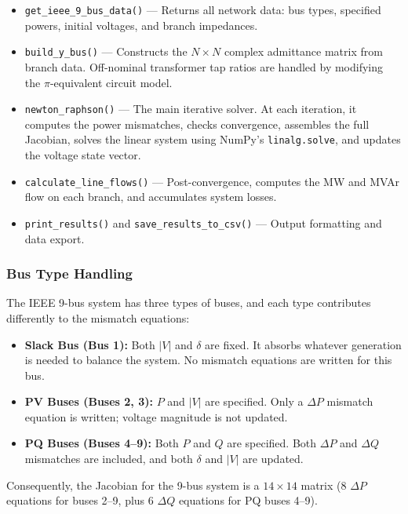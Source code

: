 \documentclass[12pt, a4paper]{article}
\begin{document}
\begin{itemize}
    \item \texttt{get\_ieee\_9\_bus\_data()} --- Returns all network data: bus types, specified powers, initial voltages, and branch impedances.
    \item \texttt{build\_y\_bus()} --- Constructs the $N \times N$ complex admittance matrix from branch data. Off-nominal transformer tap ratios are handled by modifying the $\pi$-equivalent circuit model.
    \item \texttt{newton\_raphson()} --- The main iterative solver. At each iteration, it computes the power mismatches, checks convergence, assembles the full Jacobian, solves the linear system using NumPy's \texttt{linalg.solve}, and updates the voltage state vector.
    \item \texttt{calculate\_line\_flows()} --- Post-convergence, computes the MW and MVAr flow on each branch, and accumulates system losses.
    \item \texttt{print\_results()} and \texttt{save\_results\_to\_csv()} --- Output formatting and data export.
\end{itemize}

\subsubsection{Bus Type Handling}
The IEEE 9-bus system has three types of buses, and each type contributes differently to the mismatch equations:
\begin{itemize}
    \item \textbf{Slack Bus (Bus 1):} Both $|V|$ and $\delta$ are fixed. It absorbs whatever generation is needed to balance the system. No mismatch equations are written for this bus.
    \item \textbf{PV Buses (Buses 2, 3):} $P$ and $|V|$ are specified. Only a $\Delta P$ mismatch equation is written; voltage magnitude is not updated.
    \item \textbf{PQ Buses (Buses 4--9):} Both $P$ and $Q$ are specified. Both $\Delta P$ and $\Delta Q$ mismatches are included, and both $\delta$ and $|V|$ are updated.
\end{itemize}
Consequently, the Jacobian for the 9-bus system is a $14 \times 14$ matrix (8 $\Delta P$ equations for buses 2--9, plus 6 $\Delta Q$ equations for PQ buses 4--9).
\end{document}
